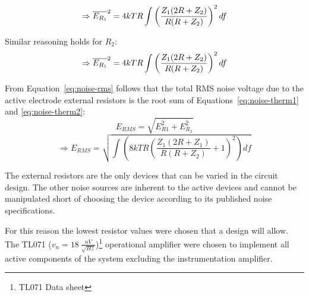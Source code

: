 \begin{equation}
	\Rightarrow	\overline{E_{R_1}}^2 = 4kTR\int\/\left (\frac{Z_1(2R +
	Z_2)}{R(R + Z_2)} \right )^2df
	\label{eq:noise-therm1}
\end{equation}

Similar reasoning holds for $R_2$:
\begin{equation}
	\Rightarrow	\overline{E_{R_1}}^2 = 4kTR\int\/\left (\frac{Z_1(2R +
	Z_2)}{R(R + Z_2)} \right )^2df
	\label{eq:noise-therm2}
\end{equation}

From Equation~\ref{eq:noise-rms} follows that the total RMS noise
voltage due to the active electrode external resistors is the root sum
of Equations~\ref{eq:noise-therm1} and \ref{eq:noise-therm2}:
\begin{equation}
	E_{RMS} = \sqrt{\overline{E_{R1}^2} + \overline{E_{R_2}^2}}
	\label{eq:noise-rtot1}
\end{equation}
\begin{equation}
	\Rightarrow E_{RMS} = \sqrt{\int \left (8kTR
	\left(\frac{Z_1(2R + Z_1)}{R(R + Z_2)} + 1\right)^2 \right) df}
	\label{eq:noise-rtot2}
\end{equation}

The external resistors are the only devices that can be varied in the
circuit design. The other noise sources are inherent to the active
devices and cannot be manipulated short of choosing the device
according to its published noise specifications.

For this reason the lowest resistor values were chosen that a design
will allow. The TL071 ($v_n = 18~\frac{nV}{\sqrt{Hz}}$)\footnote{TL071
Data sheet} operational amplifier were chosen to implement all active
components of the system excluding the instrumentation amplifier.

